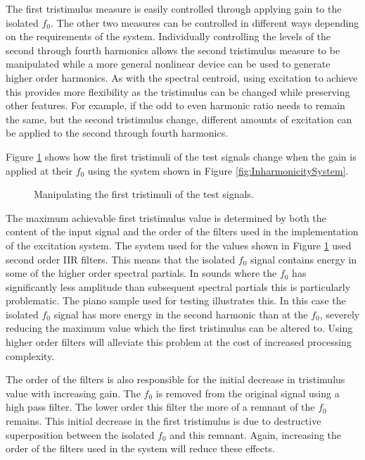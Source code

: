 		The first tristimulus measure is easily controlled through applying gain to the isolated $f_{0}$.  The
		other two measures can be controlled in different ways depending on the requirements of the system.
		Individually controlling the levels of the second through fourth harmonics allows the second tristimulus
		measure to be manipulated while a more general nonlinear device can be used to generate higher order
		harmonics. As with the spectral centroid, using excitation to achieve this provides more flexibility as the
		tristimulus can be changed while preserving other features. For example, if the odd to even harmonic ratio
		needs to remain the same, but the second tristimulus change, different amounts of excitation can be applied
		to the second through fourth harmonics.

		Figure \ref{fig:MoveTristimulus1} shows how the first tristimuli of the test signals change when the gain
		is applied at their $f_{0}$ using the system shown in Figure \ref{fig:InharmonicitySystem}.

		\begin{figure}[h!]
			\centering
			\resizebox{0.6\textwidth}{!}{}
			\caption{Manipulating the first tristimuli of the test signals.}
			\label{fig:MoveTristimulus1}
		\end{figure}

		The maximum achievable first tristimulus value is determined by both the content of the input signal and
		the order of the filters used in the implementation of the excitation system. The system used for the
		values shown in Figure \ref{fig:MoveTristimulus1} used second order IIR filters. This means that the
		isolated $f_{0}$ signal contains energy in some of the higher order spectral partials. In sounds where the
		$f_{0}$ has significantly less amplitude than subsequent spectral partials this is particularly
		problematic. The piano sample used for testing illustrates this. In this case the isolated $f_{0}$ signal
		has more energy in the second harmonic than at the $f_{0}$, severely reducing the maximum value which the
		first tristimulus can be altered to.  Using higher order filters will alleviate this problem at the cost of
		increased processing complexity.

		The order of the filters is also responsible for the initial decrease in tristimulus value with increasing
		gain. The $f_{0}$ is removed from the original signal using a high pass filter. The lower order this filter
		the more of a remnant of the $f_{0}$ remains. This initial decrease in the first tristimulus is due to
		destructive superposition between the isolated $f_{0}$ and this remnant. Again, increasing the order of the
		filters used in the system will reduce these effects.

